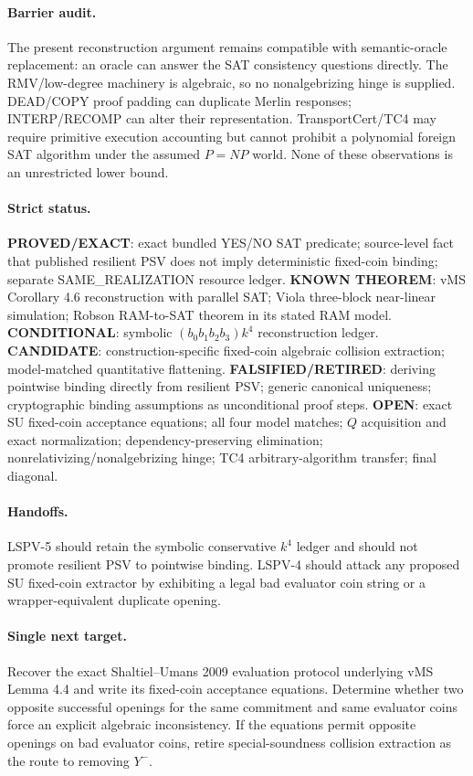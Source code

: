 \documentclass[11pt]{article}
\begin{document}
\paragraph{Barrier audit.}
The present reconstruction argument remains compatible with semantic-oracle replacement: an oracle can answer the SAT consistency questions directly. The RMV/low-degree machinery is algebraic, so no nonalgebrizing hinge is supplied. DEAD/COPY proof padding can duplicate Merlin responses; INTERP/RECOMP can alter their representation. TransportCert/TC4 may require primitive execution accounting but cannot prohibit a polynomial foreign SAT algorithm under the assumed $P=NP$ world. None of these observations is an unrestricted lower bound.

\paragraph{Strict status.}
\textbf{PROVED/EXACT}: exact bundled YES/NO SAT predicate; source-level fact that published resilient PSV does not imply deterministic fixed-coin binding; separate SAME_REALIZATION resource ledger.
\textbf{KNOWN THEOREM}: vMS Corollary 4.6 reconstruction with parallel SAT; Viola three-block near-linear simulation; Robson RAM-to-SAT theorem in its stated RAM model.
\textbf{CONDITIONAL}: symbolic $(b_0b_1b_2b_3)k^4$ reconstruction ledger.
\textbf{CANDIDATE}: construction-specific fixed-coin algebraic collision extraction; model-matched quantitative flattening.
\textbf{FALSIFIED/RETIRED}: deriving pointwise binding directly from resilient PSV; generic canonical uniqueness; cryptographic binding assumptions as unconditional proof steps.
\textbf{OPEN}: exact SU fixed-coin acceptance equations; all four model matches; $Q$ acquisition and exact normalization; dependency-preserving elimination; nonrelativizing/nonalgebrizing hinge; TC4 arbitrary-algorithm transfer; final diagonal.

\paragraph{Handoffs.}
LSPV-5 should retain the symbolic conservative $k^4$ ledger and should not promote resilient PSV to pointwise binding. LSPV-4 should attack any proposed SU fixed-coin extractor by exhibiting a legal bad evaluator coin string or a wrapper-equivalent duplicate opening.

\paragraph{Single next target.}
Recover the exact Shaltiel--Umans 2009 evaluation protocol underlying vMS Lemma 4.4 and write its fixed-coin acceptance equations. Determine whether two opposite successful openings for the same commitment and same evaluator coins force an explicit algebraic inconsistency. If the equations permit opposite openings on bad evaluator coins, retire special-soundness collision extraction as the route to removing $Y^-$.
\end{document}
